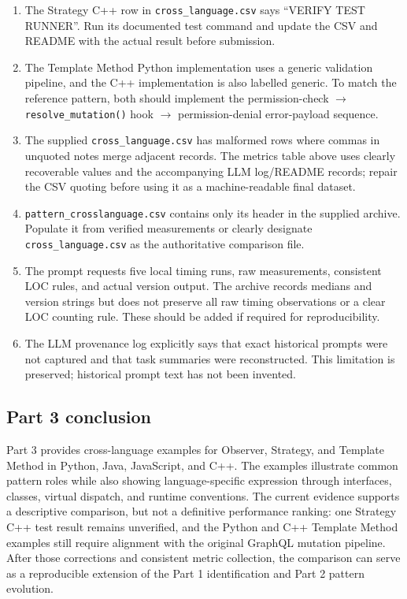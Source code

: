 \documentclass[11pt,a4paper]{article}
\newcommand{\code}[1]{\texttt{#1}}
\begin{document}
\begin{enumerate}[leftmargin=*]
    \item The Strategy C++ row in \code{cross\_language.csv} says ``VERIFY TEST RUNNER''. Run its documented test command and update the CSV and README with the actual result before submission.
    \item The Template Method Python implementation uses a generic validation pipeline, and the C++ implementation is also labelled generic. To match the reference pattern, both should implement the permission-check $\rightarrow$ \code{resolve\_mutation()} hook $\rightarrow$ permission-denial error-payload sequence.
    \item The supplied \code{cross\_language.csv} has malformed rows where commas in unquoted notes merge adjacent records. The metrics table above uses clearly recoverable values and the accompanying LLM log/README records; repair the CSV quoting before using it as a machine-readable final dataset.
    \item \code{pattern\_crosslanguage.csv} contains only its header in the supplied archive. Populate it from verified measurements or clearly designate \code{cross\_language.csv} as the authoritative comparison file.
    \item The prompt requests five local timing runs, raw measurements, consistent LOC rules, and actual version output. The archive records medians and version strings but does not preserve all raw timing observations or a clear LOC counting rule. These should be added if required for reproducibility.
    \item The LLM provenance log explicitly says that exact historical prompts were not captured and that task summaries were reconstructed. This limitation is preserved; historical prompt text has not been invented.
\end{enumerate}

\subsection{Part 3 conclusion}

Part 3 provides cross-language examples for Observer, Strategy, and Template Method in Python, Java, JavaScript, and C++. The examples illustrate common pattern roles while also showing language-specific expression through interfaces, classes, virtual dispatch, and runtime conventions. The current evidence supports a descriptive comparison, but not a definitive performance ranking: one Strategy C++ test result remains unverified, and the Python and C++ Template Method examples still require alignment with the original GraphQL mutation pipeline. After those corrections and consistent metric collection, the comparison can serve as a reproducible extension of the Part 1 identification and Part 2 pattern evolution.
\end{document}
